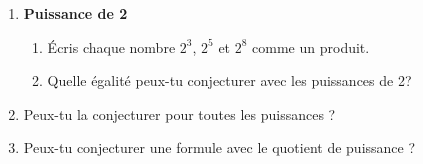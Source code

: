 
\begin{enumerate}
\item \textbf{Puissance de 2}
\begin{enumerate}
\item Écris chaque nombre $2^3$, $2^5$ et $2^8$ comme un produit.
\item Quelle égalité peux-tu conjecturer avec les puissances de 2?
\end{enumerate}
\item Peux-tu la conjecturer pour toutes les puissances ?
\item Peux-tu conjecturer une formule avec le quotient de puissance ?
\end{enumerate}
